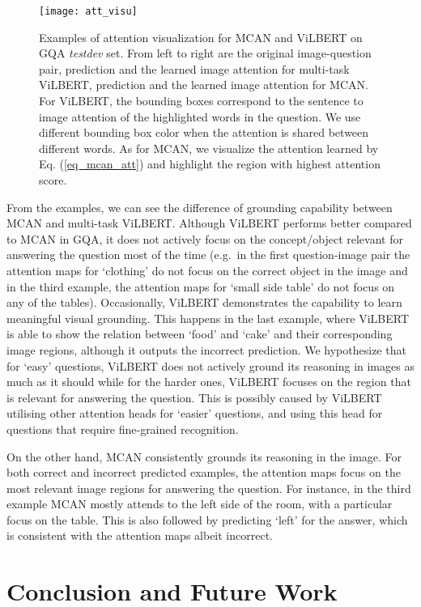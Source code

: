 \documentclass{article}
\begin{document}
\begin{figure}[!ht]
	\centering
	\texttt{[image: att\_visu]}
	\caption{Examples of attention visualization for MCAN and ViLBERT on GQA \textit{testdev} set. From left to right are the original image-question pair, prediction and the learned image attention for multi-task ViLBERT, prediction and the learned image attention for MCAN. For ViLBERT, the bounding boxes correspond to the sentence to image attention of the highlighted words in the question. We use different bounding box color when the attention is shared between different words. As for MCAN, we visualize the attention learned by Eq. (\ref{eq_mcan_att}) and highlight the region with highest attention score.}
	\label{fig:att_visu}
\end{figure}

From the examples, we can see the difference of grounding capability between MCAN and multi-task ViLBERT. Although ViLBERT performs better compared to MCAN in GQA, it does not actively focus on the concept/object relevant for answering the question most of the time (e.g.\, in the first question-image pair the attention maps for `clothing' do not focus on the correct object in the image and in the third example, the attention maps for `small side table' do not focus on any of the tables). Occasionally, ViLBERT demonstrates the capability to learn meaningful visual grounding. This happens in the last example, where ViLBERT is able to show the relation between `food' and `cake' and their corresponding image regions, although it outputs the incorrect prediction. We hypothesize that for `easy' questions, ViLBERT does not actively ground its reasoning in images as much as it should while for the harder ones, ViLBERT focuses on the region that is relevant for answering the question. This is possibly caused by ViLBERT utilising other attention heads for `easier' questions, and using this head for questions that require fine-grained recognition.

On the other hand, MCAN consistently grounds its reasoning in the image. For both correct and incorrect predicted examples, the attention maps focus on the most relevant image regions for answering the question. For instance, in the third example MCAN mostly attends to the left side of the room, with a particular focus on the table. This is also followed by predicting `left' for the answer, which is consistent with the attention maps albeit incorrect.

\section{Conclusion and Future Work}
\end{document}
